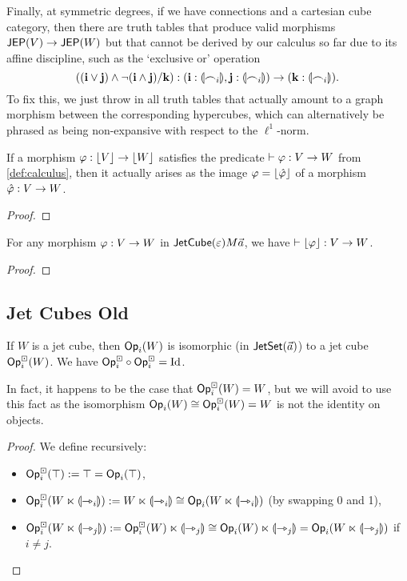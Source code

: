 \documentclass[a4paper]{article}
\begin{document}
Finally, at symmetric degrees, if we have connections and a cartesian cube category, then there are truth tables that produce valid morphisms $\mathsf{JEP}(V) \to \mathsf{JEP}(W)$ but that cannot be derived by our calculus so far due to its affine discipline, such as the `exclusive or' operation
\[
	((\mathbf{i} \vee \mathbf{j}) \wedge \lnot(\mathbf{i} \wedge \mathbf{j})/\mathbf{k}) : (\mathbf{i} : {\llparenthesis \frown_i \rrparenthesis}, \mathbf{j} : {\llparenthesis \frown_i \rrparenthesis}) \to (\mathbf{k} : {\llparenthesis \frown_i \rrparenthesis}).
\]
To fix this, we just throw in all truth tables that actually amount to a graph morphism between the corresponding hypercubes, which can alternatively be phrased as being non-expansive with respect to the $\ell^1$-norm.

\begin{theorem}[Soundness]
	If a morphism $\varphi : \mathopen{}\left\lfloor V \right\rfloor\mathclose{} \to \mathopen{}\left\lfloor W \right\rfloor\mathclose{}$ satisfies the predicate $\vdash \varphi : V \to W$ from \cref{def:calculus}, then it actually arises as the image $\varphi = \mathopen{}\left\lfloor \hat {\varphi} \right\rfloor\mathclose{}$ of a morphism $\hat {\varphi} : V \to W$.
\end{theorem}
\begin{proof}
\end{proof}

\begin{theorem}[Completeness]
	For any morphism $\varphi : V \to W$ in $\mathsf{JetCube}\mathopen{}\left( \varepsilon \right)\mathclose{} M {\vec a}$, we have $\vdash \mathopen{}\left\lfloor \varphi \right\rfloor\mathclose{} : V \to W$.
\end{theorem}
\begin{proof}
\end{proof}


\subsection{Jet Cubes Old}

\begin{corollary} \label{thm:jet-cube-op}
	If $W$ is a jet cube, then ${\mathsf{Op}}_i(W)$ is isomorphic (in $\mathsf{JetSet}(\vec a)$) to a jet cube ${\mathsf{Op}}^\boxdot_i(W)$.
	We have ${\mathsf{Op}}^\boxdot_i \circ {\mathsf{Op}}^\boxdot_i = \mathrm{Id}$.
\end{corollary}
In fact, it happens to be the case that ${\mathsf{Op}}^\boxdot_i(W) = W$, but we will avoid to use this fact as the isomorphism ${\mathsf{Op}}_i(W) \cong {\mathsf{Op}}^\boxdot_i(W) = W$ is not the identity on objects.
\begin{proof}
	We define recursively:
	\begin{itemize}
		\item ${\mathsf{Op}}^\boxdot_i(\top) := \top = {\mathsf{Op}}_i(\top)$,
		\item ${\mathsf{Op}}^\boxdot_i(W \ltimes {\llparenthesis \rightarrowtriangle_i \rrparenthesis}) := W \ltimes {\llparenthesis \rightarrowtriangle_i \rrparenthesis} \cong {\mathsf{Op}}_i(W \ltimes {\llparenthesis \rightarrowtriangle_i \rrparenthesis})$ (by swapping 0 and 1),
		\item ${\mathsf{Op}}^\boxdot_i(W \ltimes {\llparenthesis \rightarrowtriangle_j \rrparenthesis}) := {\mathsf{Op}}^\boxdot_i(W) \ltimes {\llparenthesis \rightarrowtriangle_j \rrparenthesis} \cong {\mathsf{Op}}_i(W) \ltimes {\llparenthesis \rightarrowtriangle_j \rrparenthesis} = {\mathsf{Op}}_i(W \ltimes {\llparenthesis \rightarrowtriangle_j \rrparenthesis})$ if $i \neq j$. \qedhere
	\end{itemize}
\end{proof}
\end{document}
